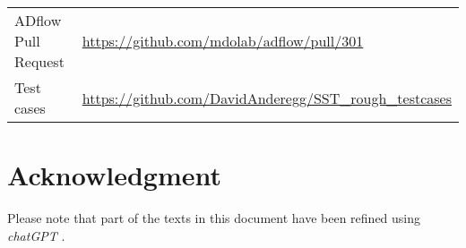 \begin{tabular}{l l}
    ADflow Pull Request &
    \url{https://github.com/mdolab/adflow/pull/301}\footnotemark \\

    Test cases & \url{https://github.com/DavidAnderegg/SST_rough_testcases}
\end{tabular}









\section{Acknowledgment}
Please note that part of the texts in this document have been refined using
\textit{chatGPT} \cite{ChatGPT}.
